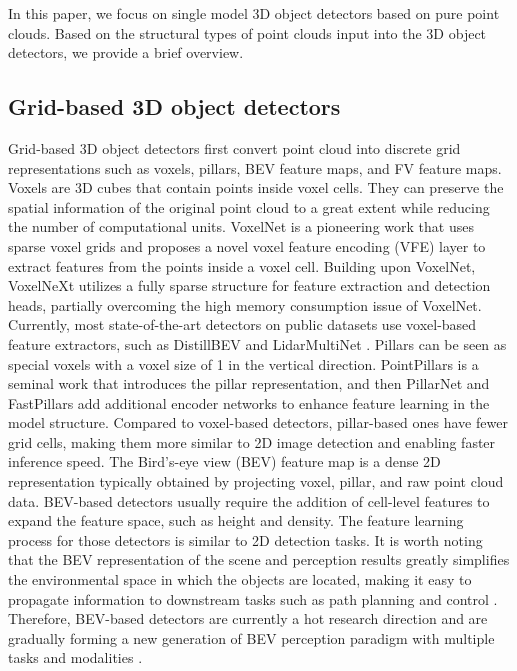 In this paper, we focus on single model 3D object detectors based on pure point clouds. Based on the structural types of point clouds input into the 3D object detectors, we provide a brief overview.

\subsection{Grid-based 3D object detectors}
Grid-based 3D object detectors first convert point cloud into discrete grid representations such as voxels, pillars, BEV feature maps, and FV feature maps. Voxels are 3D cubes that contain points inside voxel cells. They can preserve the spatial information of the original point cloud to a great extent while reducing the number of computational units. VoxelNet \cite{zhou_voxelnet_2017} is a pioneering work that uses sparse voxel grids and proposes a novel voxel feature encoding (VFE) layer to extract features from the points inside a voxel cell. Building upon VoxelNet, VoxelNeXt \cite{chen2023voxelnext} utilizes a fully sparse structure for feature extraction and detection heads, partially overcoming the high memory consumption issue of VoxelNet. Currently, most state-of-the-art detectors on public datasets use voxel-based feature extractors, such as DistillBEV \cite{wang2023distillbev} and LidarMultiNet \cite{ye_lidarmultinet_2022}. Pillars can be seen as special voxels with a voxel size of 1 in the vertical direction. PointPillars \cite{lang_pointpillars_2019} is a seminal work that introduces the pillar representation, and then PillarNet \cite{shi_pillarnet_2022} and FastPillars \cite{zhou_fastpillars_2023} add additional encoder networks to enhance feature learning in the model structure. Compared to voxel-based detectors, pillar-based ones have fewer grid cells, making them more similar to 2D image detection and enabling faster inference speed.
The Bird’s-eye view (BEV) feature map is a dense 2D representation typically obtained by projecting voxel, pillar, and raw point cloud data. BEV-based detectors \cite{simon_complex-yolo_2018,noauthor_multi-view_nodate,beltran2018birdnet,zeng2018rt3d,ali2018yolo3d,barrera2020birdnet+} usually require the addition of cell-level features to expand the feature space, such as height and density. The feature learning process for those detectors is similar to 2D detection tasks. It is worth noting that the BEV representation of the scene and perception results greatly simplifies the environmental space in which the objects are located, making it easy to propagate information to downstream tasks such as path planning and control \cite{jia2023driveadapter}. Therefore, BEV-based detectors are currently a hot research direction and are gradually forming a new generation of BEV perception paradigm with multiple tasks and modalities \cite{hu2023planning,li2023delving,li2022bevformer}.
